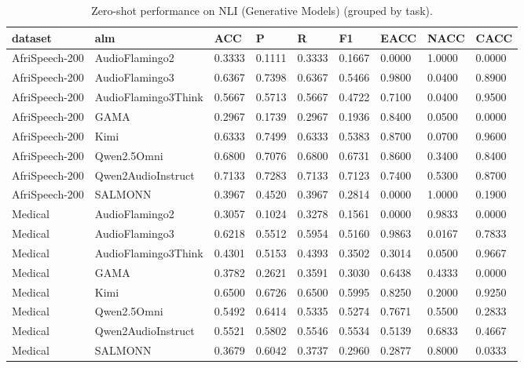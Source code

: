 \begin{table}
\caption{Zero-shot performance on NLI (Generative Models) (grouped by task).}
\label{tab:nli_generative_models_results}
\begin{tabular}{lllllllll}
\toprule
dataset & alm & ACC & P & R & F1 & EACC & NACC & CACC \\
\midrule
AfriSpeech-200 & AudioFlamingo2 & 0.3333 & 0.1111 & 0.3333 & 0.1667 & 0.0000 & 1.0000 & 0.0000 \\
AfriSpeech-200 & AudioFlamingo3 & 0.6367 & 0.7398 & 0.6367 & 0.5466 & 0.9800 & 0.0400 & 0.8900 \\
AfriSpeech-200 & AudioFlamingo3Think & 0.5667 & 0.5713 & 0.5667 & 0.4722 & 0.7100 & 0.0400 & 0.9500 \\
AfriSpeech-200 & GAMA & 0.2967 & 0.1739 & 0.2967 & 0.1936 & 0.8400 & 0.0500 & 0.0000 \\
AfriSpeech-200 & Kimi & 0.6333 & 0.7499 & 0.6333 & 0.5383 & 0.8700 & 0.0700 & 0.9600 \\
AfriSpeech-200 & Qwen2.5Omni & 0.6800 & 0.7076 & 0.6800 & 0.6731 & 0.8600 & 0.3400 & 0.8400 \\
AfriSpeech-200 & Qwen2AudioInstruct & 0.7133 & 0.7283 & 0.7133 & 0.7123 & 0.7400 & 0.5300 & 0.8700 \\
AfriSpeech-200 & SALMONN & 0.3967 & 0.4520 & 0.3967 & 0.2814 & 0.0000 & 1.0000 & 0.1900 \\
Medical & AudioFlamingo2 & 0.3057 & 0.1024 & 0.3278 & 0.1561 & 0.0000 & 0.9833 & 0.0000 \\
Medical & AudioFlamingo3 & 0.6218 & 0.5512 & 0.5954 & 0.5160 & 0.9863 & 0.0167 & 0.7833 \\
Medical & AudioFlamingo3Think & 0.4301 & 0.5153 & 0.4393 & 0.3502 & 0.3014 & 0.0500 & 0.9667 \\
Medical & GAMA & 0.3782 & 0.2621 & 0.3591 & 0.3030 & 0.6438 & 0.4333 & 0.0000 \\
Medical & Kimi & 0.6500 & 0.6726 & 0.6500 & 0.5995 & 0.8250 & 0.2000 & 0.9250 \\
Medical & Qwen2.5Omni & 0.5492 & 0.6414 & 0.5335 & 0.5274 & 0.7671 & 0.5500 & 0.2833 \\
Medical & Qwen2AudioInstruct & 0.5521 & 0.5802 & 0.5546 & 0.5534 & 0.5139 & 0.6833 & 0.4667 \\
Medical & SALMONN & 0.3679 & 0.6042 & 0.3737 & 0.2960 & 0.2877 & 0.8000 & 0.0333 \\
\bottomrule
\end{tabular}
\end{table}
